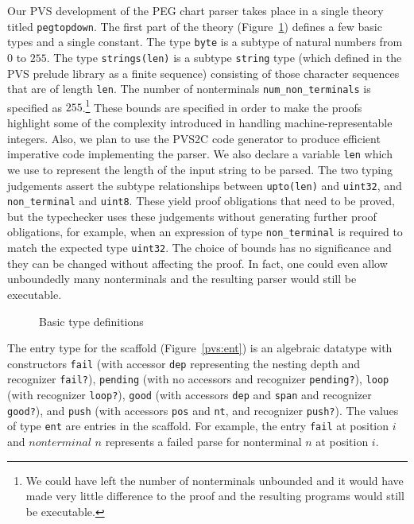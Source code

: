 \documentclass[sigplan,10pt,anonymous,review]{acmart}\settopmatter{printfolios=true,printccs=false,printacmref=false}
\begin{document}
\begin{CCSXML}
Our PVS development of the PEG chart parser takes place in a single theory
titled \texttt{pegtopdown}.
The first part of the theory (Figure~\ref{pvs:byte})
defines a few basic types and a single
constant.  The type \texttt{byte} is a subtype of natural numbers from
$0$ to $255$\@.  The type \texttt{strings(len)} is a subtype
\texttt{string} type (which defined in the PVS prelude library as a
finite sequence) consisting of those character sequences that are of
length \texttt{len}\@.  The number of nonterminals
\texttt{num\_non\_terminals} is specified as $255$\@.\footnote{We could
  have left the number of nonterminals unbounded and it would have
  made very little difference to the proof and the resulting programs
  would still be executable.}  These bounds are specified in order to
make the proofs highlight some of the complexity introduced in
handling machine-representable integers. Also, we plan to use
the PVS2C code generator to produce efficient imperative code implementing
the parser.  We also declare a variable \texttt{len} which we use to represent the length
of the input string to be parsed.  The two typing judgements assert the
subtype relationships between \texttt{upto(len)} and \texttt{uint32},
and \texttt{non\_terminal} and \texttt{uint8}\@.  These yield proof
obligations that need to be proved, but the typechecker uses these
judgements without generating further proof obligations, for example,
when an expression of type \texttt{non\_terminal} is required to match
the expected type \texttt{uint32}\@.  The choice of bounds has no 
significance and they can be changed without affecting the proof.
In fact, one could even allow unboundedly many nonterminals and the resulting
parser would still be executable.  
\begin{figure}[h!]
  {}
  \vspace*{-4mm}
			\caption{\small Basic type definitions}
			\label{pvs:byte}
\end{figure}

The entry type for the scaffold (Figure~\ref{pvs:ent})
is an algebraic datatype with
constructors \texttt{fail} (with accessor \texttt{dep} representing
the nesting depth and recognizer \texttt{fail?}), \texttt{pending}
(with no accessors and recognizer \texttt{pending?}), \texttt{loop}
(with recognizer \texttt{loop?}), \texttt{good} (with accessors
\texttt{dep} and \texttt{span} and recognizer \texttt{good?}), and
\texttt{push} (with accessors \texttt{pos} and \texttt{nt}, and
recognizer \texttt{push?}).  The values of type \texttt{ent} are
entries in the scaffold.  For example, the entry \texttt{fail} at
position $i$ and $nonterminal$ $n$ represents a failed parse for
nonterminal $n$ at position $i$.


\end{CCSXML}
\end{document}
